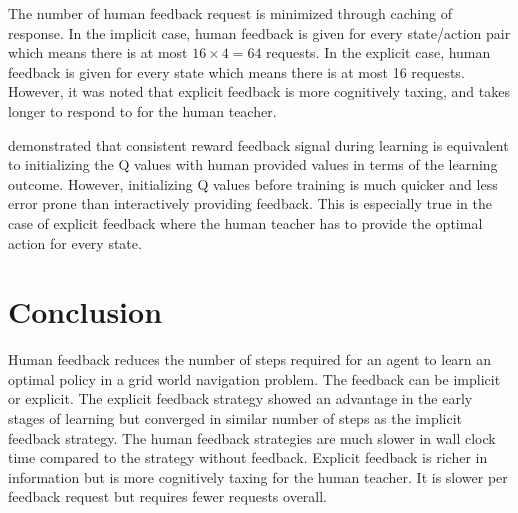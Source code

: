 \documentclass[conference]{IEEEtran}
\begin{document}
The number of human feedback request is minimized through caching of response. In the implicit case, human feedback is given for every state/action pair which means there is at most \(16 \times 4 = 64\) requests. In the explicit case, human feedback is given for every state which means there is at most 16 requests. However, it was noted that explicit feedback is more cognitively taxing, and takes longer to respond to for the human teacher.

\cite{wiewioraPotentialBasedShapingQValue2003} demonstrated that consistent reward feedback signal during learning is equivalent to initializing the Q values with human provided values in terms of the learning outcome. However, initializing Q values before training is much quicker and less error prone than interactively providing feedback. This is especially true in the case of explicit feedback where the human teacher has to provide the optimal action for every state.

\section{Conclusion}

Human feedback reduces the number of steps required for an agent to learn an optimal policy in a grid world navigation problem. The feedback can be implicit or explicit. The explicit feedback strategy showed an advantage in the early stages of learning but converged in similar number of steps as the implicit feedback strategy. The human feedback strategies are much slower in wall clock time compared to the strategy without feedback. Explicit feedback is richer in information but is more cognitively taxing for the human teacher. It is slower per feedback request but requires fewer requests overall.



\end{document}

